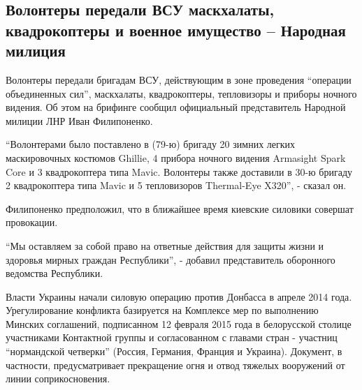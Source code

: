  
 
 
 
 
\subsection{Волонтеры передали ВСУ маскхалаты, квадрокоптеры и военное имущество – Народная милиция}
\label{sec:07_01_2022.stz.news.lnr.lug_info.1.volontery_vsu_pomosch}


Волонтеры передали бригадам ВСУ, действующим в зоне проведения \enquote{операции
объединенных сил}, маскхалаты, квадрокоптеры, тепловизоры и приборы ночного
видения. Об этом на брифинге сообщил официальный представитель Народной милиции
ЛНР Иван Филипоненко.

\enquote{Волонтерами было поставлено в (79-ю) бригаду 20 зимних легких маскировочных
костюмов Ghillie, 4 прибора ночного видения Armasight Spark Core и 3
квадрокоптера типа Mavic. Волонтеры также доставили в 30-ю бригаду 2
квадрокоптера типа Mavic и 5 тепловизоров Thermal-Eye X320}, - сказал он.

Филипоненко предположил, что в ближайшее время киевские силовики совершат
провокации.

\enquote{Мы оставляем за собой право на ответные действия для защиты жизни и здоровья
мирных граждан Республики}, - добавил представитель оборонного ведомства
Республики.

Власти Украины начали силовую операцию против Донбасса в апреле 2014 года.
Урегулирование конфликта базируется на Комплексе мер по выполнению Минских
соглашений, подписанном 12 февраля 2015 года в белорусской столице участниками
Контактной группы и согласованном с главами стран - участниц \enquote{нормандской
четверки} (Россия, Германия, Франция и Украина). Документ, в частности,
предусматривает прекращение огня и отвод тяжелых вооружений от линии
соприкосновения. 
